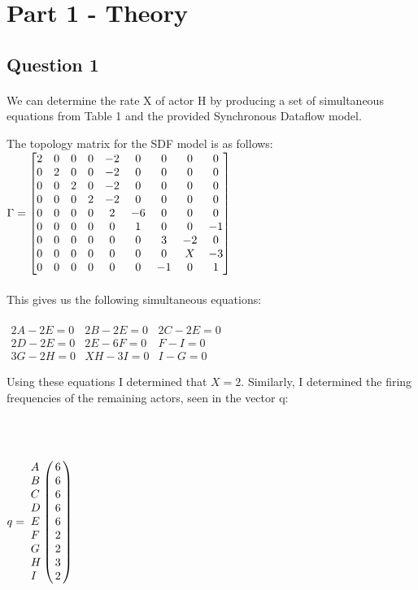 \documentclass[12pt]{article} %
\begin{document}
\section{Part 1 - Theory} %


\subsection{Question 1} %

\paragraph{}
We can determine the rate X of actor H by producing a set of simultaneous equations from Table 1 and the provided Synchronous Dataflow model.

The topology matrix for the SDF model is as follows:
\\

$
\Gamma = \begin{bmatrix}
		2 & 0 & 0 & 0 & -2 & 0 & 0 & 0 & 0 \cr
		0 & 2 & 0 & 0 & -2 & 0 & 0 & 0 & 0 \cr
		0 & 0 & 2 & 0 & -2 & 0 & 0 & 0 & 0 \cr
		0 & 0 & 0 & 2 & -2 & 0 & 0 & 0 & 0 \cr
		0 & 0 & 0 & 0 & 2 & -6 & 0 & 0 & 0 \cr
		0 & 0 & 0 & 0 & 0 & 1 & 0 & 0 & -1 \cr
		0 & 0 & 0 & 0 & 0 & 0 & 3 & -2 & 0 \cr
		0 & 0 & 0 & 0 & 0 & 0 & 0 & X & -3 \cr
		0 & 0 & 0 & 0 & 0 & 0 & -1 & 0 & 1 \cr
		\end{bmatrix}
$
\\ \\
This gives us the following simultaneous equations:
\\ \\
$
\begin{matrix}
2A - 2E = 0 & 2B - 2E = 0 & 2C - 2E = 0 \\
2D - 2E = 0 & 2E - 6F = 0 & F - I = 0 \\
3G - 2H = 0 & XH - 3I = 0 & I - G = 0
\end{matrix}
$
\\

\begin{minipage}{0.6\textwidth}
\begin{flushleft}
Using these equations I determined that $X = 2$. Similarly, I determined the firing frequencies of the remaining actors, seen in the vector q:
\end{flushleft}
\end{minipage}
~
\begin{minipage}{0.2\textwidth}
\begin{flushright}
$
q = \bordermatrix{~ & ~ \cr
				A & 6 \cr
				B & 6 \cr
				C & 6 \cr
				D & 6 \cr
				E & 6 \cr
				F & 2 \cr
				G & 2 \cr
				H & 3 \cr
				I & 2 \cr}	
$
\end{flushright}
\end{minipage}\\
\end{document}
